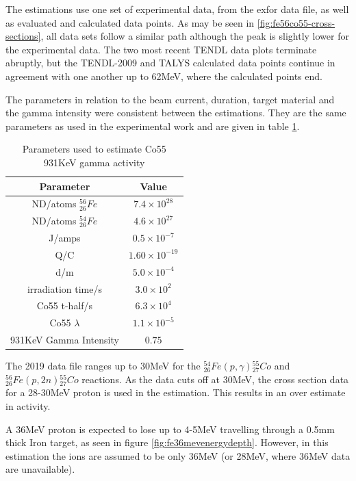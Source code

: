 The estimations use one set of experimental data, from the \acrshort{exfor} data file, as well as evaluated and calculated data points.  As may be seen in \ref{fig:fe56co55-cross-sections}, all data sets follow a similar path although the peak is slightly lower for the experimental data.  The two most recent TENDL data plots terminate abruptly, but the TENDL-2009 and TALYS calculated data points continue in agreement with one another up to 62MeV, where the calculated points end.

The parameters in relation to the beam current, duration, target material and the gamma intensity were consistent between the estimations.  They are the same parameters as used in the experimental work and are given in table \ref{table:activityestimation1}.

\FloatBarrier
\begin{table}[h]
\begin{center}
\begin{tabular}{c c}
\hline\hline
Parameter & Value\\
\hline\hline
ND/atoms ${}^{56}_{26}Fe$ & $7.4 \times 10^{28}$ \\
ND/atoms ${}^{54}_{26}Fe$ & $4.6 \times 10^{27}$ \\
J/amps & $0.5 \times 10^{-7}$ \\
Q/C & $1.60 \times 10^{-19}$ \\
d/m & $5.0 \times 10^{-4}$ \\
irradiation time/s & $3.0 \times 10^{2}$ \\
Co55 t-half/s & $6.3 \times 10^{4}$ \\
Co55 $\lambda$ & $1.1 \times 10^{-5}$ \\
931KeV Gamma Intensity & $0.75$ \\
\hline\hline
\end{tabular}
\end{center}
\caption{Parameters used to estimate Co55 931KeV gamma activity}
\label{table:activityestimation1}
\end{table}

The 2019 data file ranges up to 30MeV for the ${}^{54}_{26} Fe (p, \gamma) {}^{55}_{27} Co$ and ${}^{56}_{26} Fe (p, 2n) {}^{55}_{27} Co$ reactions.  As the data cuts off at 30MeV, the cross section data for a 28-30MeV proton is used in the estimation.  This results in an over estimate in activity.

A 36MeV proton is expected to lose up to 4-5MeV travelling through a 0.5mm thick Iron target, as seen in figure \ref{fig:fe36mevenergydepth}.  However, in this estimation the ions are assumed to be only 36MeV (or 28MeV, where 36MeV data are unavailable).


